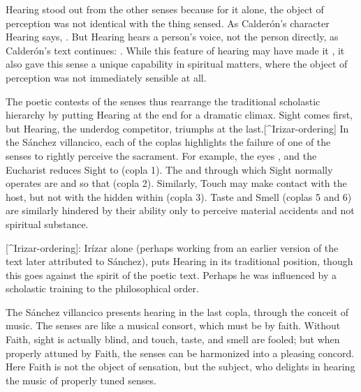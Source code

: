 Hearing stood out from the other senses because for it alone, the object of perception was not identical with the thing sensed.
As Calderón's character Hearing says, .
\Autocite[ll. 577--582]{Calderon:Retiro}
But Hearing hears a person's voice, not the person directly, as Calderón's text continues: .
\Autocite[ll. 583--586]{Calderon:Retiro}
While this feature of hearing may have made it , it also gave this sense a unique capability in spiritual matters, where the object of perception was not immediately sensible at all.

The poetic contests of the senses thus rearrange the traditional scholastic hierarchy by putting Hearing at the end for a dramatic climax.
Sight comes first, but Hearing, the underdog competitor, triumphs at the last.[^Irizar-ordering]  In the Sánchez villancico, each of the coplas highlights the failure of one of the senses to rightly perceive the sacrament.
For example, the eyes , and the Eucharist reduces Sight to  (copla 1).
The  and  through which Sight normally operates are   and  so that  (copla 2).
Similarly, Touch may make contact with the host, but not with the  hidden within (copla 3).
Taste and Smell (coplas 5 and 6) are similarly hindered by their ability only to perceive material accidents and not spiritual substance.

[^Irizar-ordering]:  Irízar alone (perhaps working from an earlier version of the text later attributed to Sánchez), puts Hearing in its traditional position, though this goes against the spirit of the poetic text.
Perhaps he was influenced by a scholastic training to  the philosophical order.

The Sánchez villancico presents hearing in the last copla, through the conceit of music.
The senses are  like a musical consort, which must be  by faith.
Without Faith, sight is actually blind, and touch, taste, and smell are fooled; but when properly attuned by Faith, the senses can be harmonized into a pleasing concord.
Here Faith is not the object of sensation, but the subject, who delights in hearing the music of properly tuned senses.

